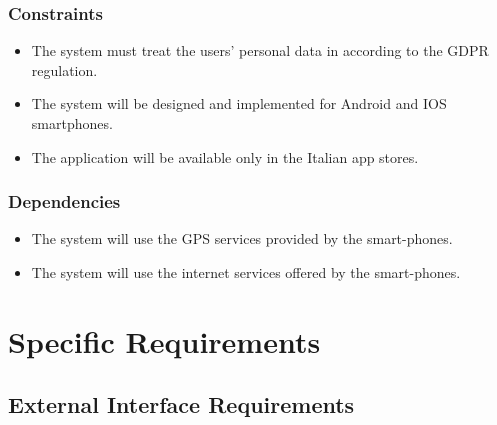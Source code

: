 \documentclass[titlepage]{article}
\begin{document}
\subsubsection{Constraints }
\begin{itemize}
	\item  The system must treat the users' personal data in according to the GDPR regulation.
	\item The system will be designed and implemented for Android and IOS smartphones.
	\item The application will be available only in the Italian app stores.
\end{itemize}

\subsubsection{Dependencies }
\begin{itemize}
	\item The system will use the GPS services provided by the smart-phones.
	\item The system will use the internet services offered by the smart-phones.\\
\end{itemize}



\section{Specific Requirements}
\subsection{External Interface Requirements}
\end{document}
